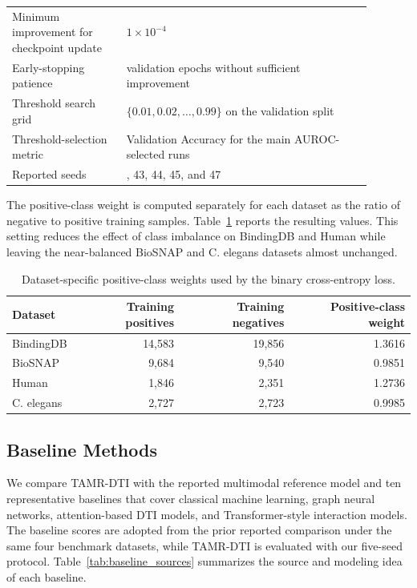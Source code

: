 \begin{table}[!htbp]
\begin{center}
\begin{tabular}{>{\raggedright\arraybackslash}p{0.29\linewidth}>{\raggedright\arraybackslash}p{0.60\linewidth}}
Minimum improvement for checkpoint update & $1\times10^{-4}$ \\
Early-stopping patience & 10 validation epochs without sufficient improvement \\
Threshold search grid & $\{0.01,0.02,\ldots,0.99\}$ on the validation split \\
Threshold-selection metric & Validation Accuracy for the main AUROC-selected runs \\
Reported seeds & 42, 43, 44, 45, and 47 \\
\bottomrule
\end{tabular}
\end{center}
\end{table}

The positive-class weight is computed separately for each dataset as the ratio of negative to positive training samples. Table~\ref{tab:dataset_pos_weight} reports the resulting values. This setting reduces the effect of class imbalance on BindingDB and Human while leaving the near-balanced BioSNAP and C. elegans datasets almost unchanged.

\begin{table}[!htbp]
\caption{Dataset-specific positive-class weights used by the binary cross-entropy loss.}
\label{tab:dataset_pos_weight}
\begin{center}
\begin{tabular}{lrrr}
\toprule
Dataset & Training positives & Training negatives & Positive-class weight \\
\midrule
BindingDB & 14,583 & 19,856 & 1.3616 \\
BioSNAP & 9,684 & 9,540 & 0.9851 \\
Human & 1,846 & 2,351 & 1.2736 \\
C. elegans & 2,727 & 2,723 & 0.9985 \\
\bottomrule
\end{tabular}
\end{center}
\end{table}

\subsection{Baseline Methods}

We compare TAMR-DTI with the reported multimodal reference model and ten representative baselines that cover classical machine learning, graph neural networks, attention-based DTI models, and Transformer-style interaction models. The baseline scores are adopted from the prior reported comparison under the same four benchmark datasets, while TAMR-DTI is evaluated with our five-seed protocol. Table~\ref{tab:baseline_sources} summarizes the source and modeling idea of each baseline.

